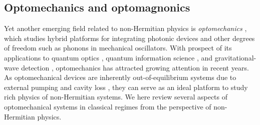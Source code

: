 \documentclass{tADP2e}
\theoremstyle{plain}
\theoremstyle{plain}
\theoremstyle{definition}
\begin{document}
\subsection{Optomechanics and optomagnonics\label{secoptmech}}
Yet another emerging field related to non-Hermitian physics is {\it optomechanics}  \cite{AM14}, which studies hybrid platforms for integrating photonic devices and other degrees of freedom such as phonons in mechanical oscillators. 
With prospect of its applications to quantum optics \cite{HM09,EC11,RM18}, quantum information science \cite{OCAD10,SK11}, and gravitational-wave detection \cite{MDE112}, optomechanics has attracted growing attention in recent years. 
As optomechanical devices are inherently out-of-equilibrium systems due to  external pumping and cavity loss \cite{AM14,VE172}, they can serve as an ideal platform to study rich physics of non-Hermitian systems. We here review several aspects of optomechanical systems in classical regimes from the perspective of non-Hermitian physics.
\end{document}
